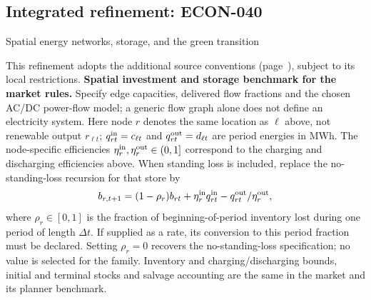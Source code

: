 \documentclass[11pt,a4paper]{article}
\begin{document}
\subsection*{Integrated refinement: ECON-040}
{\sffamily\small\color{muted}Spatial energy networks, storage, and the green transition\par}
This refinement adopts the additional source conventions
(page~\pageref{audited:conventions}), subject to its local restrictions.
\textbf{Spatial investment and storage benchmark for the market rules.}
Specify edge capacities, delivered flow fractions and the chosen AC/DC
power-flow model; a generic flow graph alone does not define an electricity
system. Here node $r$ denotes the same location as $\ell$ above, not renewable output $r_{\ell t}$; $q_{rt}^{\rm in}=c_{\ell t}$ and $q_{rt}^{\rm out}=d_{\ell t}$ are period energies in MWh. The node-specific efficiencies $\eta_r^{\rm in},\eta_r^{\rm out}\in(0,1]$ correspond to the charging and discharging efficiencies above. When standing loss is included, replace the no-standing-loss recursion for that store by
\[
b_{r,t+1}=(1-\rho_r)b_{rt}+\eta_r^{\rm in}q_{rt}^{\rm in}
                              -q_{rt}^{\rm out}/\eta_r^{\rm out},
\]
where $\rho_r\in[0,1]$ is the fraction of beginning-of-period inventory lost during one period of length $\Delta t$. If supplied as a rate, its conversion to this period fraction must be declared. Setting $\rho_r=0$ recovers the no-standing-loss specification; no value is selected for the family. Inventory and charging/discharging bounds, initial and terminal stocks and salvage accounting are the same in the market and its planner benchmark.
\end{document}
